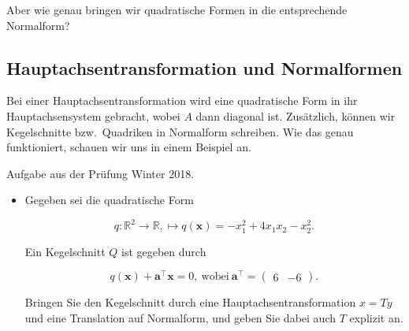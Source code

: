 \begin{figure}[h]
\begin{minipage}{0.32\textwidth}
    \end{minipage}
\end{figure}

Aber wie genau bringen wir quadratische Formen in die entsprechende Normalform?

\subsection{Hauptachsentransformation und Normalformen}

Bei einer Hauptachsentransformation wird eine quadratische Form in ihr Hauptachsensystem gebracht, wobei \( A \) dann diagonal ist. Zusätzlich, können wir Kegelschnitte bzw.\ Quadriken in Normalform schreiben. Wie das genau funktioniert, schauen wir uns in einem Beispiel an.

\vspace{1\baselineskip}

Aufgabe aus der Prüfung Winter 2018. 
\begin{itemize}
    \item Gegeben sei die quadratische Form 

    \begin{equation*}
        q: \mathbb{R}^2 \to \mathbb{R}, \mapsto q(\mathbf{x})=-x_1^2+4x_1x_2-x_2^2.
    \end{equation*}

    Ein Kegelschnitt \( Q \) ist gegeben durch 

    \begin{equation*}
        q(\mathbf{x}) + \mathbf{a}^\top \mathbf{x} = 0, \ \text{wobei} \ \mathbf{a}^\top = \begin{pmatrix} 6 & -6 \end{pmatrix}.
    \end{equation*}

    Bringen Sie den Kegelschnitt durch eine Hauptachsentransformation \( x = Ty \) und eine Translation auf Normalform, und geben Sie dabei auch \( T \) explizit an. 

\end{itemize}

